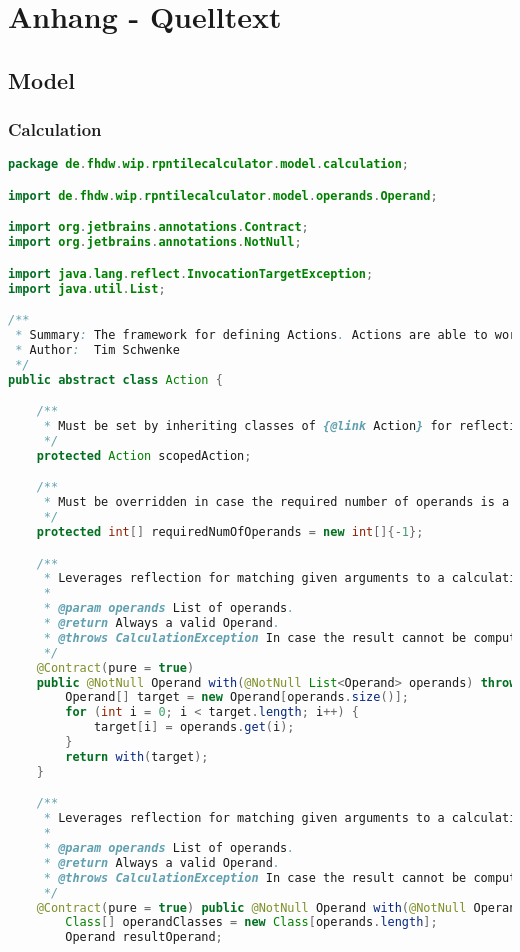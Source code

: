 
\section{Anhang - Quelltext}

\subsection{Model}

\subsubsection{Calculation}

\begin{lstlisting}[caption=Action (Schwenke),label=list:Action,language=Java]
package de.fhdw.wip.rpntilecalculator.model.calculation;

import de.fhdw.wip.rpntilecalculator.model.operands.Operand;

import org.jetbrains.annotations.Contract;
import org.jetbrains.annotations.NotNull;

import java.lang.reflect.InvocationTargetException;
import java.util.List;

/**
 * Summary: The framework for defining Actions. Actions are able to work with operands from the stack or executor functions.
 * Author:  Tim Schwenke
 */
public abstract class Action {

    /**
     * Must be set by inheriting classes of {@link Action} for reflection to work.
     */
    protected Action scopedAction;

    /**
     * Must be overridden in case the required number of operands is a fixed amount.
     */
    protected int[] requiredNumOfOperands = new int[]{-1};

    /**
     * Leverages reflection for matching given arguments to a calculation method.
     *
     * @param operands List of operands.
     * @return Always a valid Operand.
     * @throws CalculationException In case the result cannot be computed.
     */
    @Contract(pure = true)
    public @NotNull Operand with(@NotNull List<Operand> operands) throws CalculationException {
        Operand[] target = new Operand[operands.size()];
        for (int i = 0; i < target.length; i++) {
            target[i] = operands.get(i);
        }
        return with(target);
    }

	/**
     * Leverages reflection for matching given arguments to a calculation method.
     *
     * @param operands List of operands.
     * @return Always a valid Operand.
     * @throws CalculationException In case the result cannot be computed.
     */
    @Contract(pure = true) public @NotNull Operand with(@NotNull Operand... operands) throws CalculationException {
        Class[] operandClasses = new Class[operands.length];
        Operand resultOperand;


\end{lstlisting}
